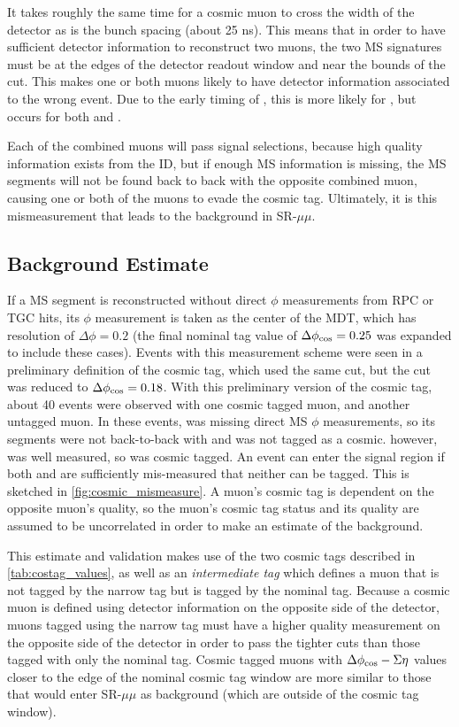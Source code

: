 It takes roughly the same time for a cosmic muon to cross the width of the detector as is the bunch spacing (about 25 ns). This means that in order to have sufficient detector information to reconstruct two muons, the two \ac{MS} signatures must be at the edges of the detector readout window and near the bounds of the \tavg cut. This makes one or both muons likely to have detector information associated to the wrong event. Due to the early timing of \mt, this is more likely for \mt, but occurs for both \mt and \mb. 

Each of the combined muons will pass signal selections, because high quality information exists from the \ac{ID}, but if enough \ac{MS} information is missing, the \ac{MS} segments will not be found back to back with the opposite combined muon, causing one or both of the muons to evade the cosmic tag. Ultimately, it is this mismeasurement that leads to the background in SR-$\mu\mu$. 


\subsection{Background Estimate}

If a \ac{MS} segment is reconstructed without direct $\phi$ measurements from \ac{RPC} or \ac{TGC} hits, its $\phi$ measurement is taken as the center of the \ac{MDT}, which has resolution of $\Delta \phi = 0.2$ (the final nominal tag value of $\Delta \phi_{\text{cos}} = 0.25$ was expanded to include these cases). Events with this measurement scheme were seen in a preliminary definition of the cosmic tag, which used the same \sigeta cut, but the \dphicos cut was reduced to $\Delta \phi_{\text{cos}} = 0.18$. With this preliminary version of the cosmic tag, about 40 events were observed with one cosmic tagged muon, and another untagged muon. In these events, \mt was missing direct \ac{MS} $\phi$ measurements, so its segments were not back-to-back with \mb and \mb was not tagged as a cosmic. \mb however, was well measured, so \mt was cosmic tagged. An event can enter the signal region if both \mb and \mt are sufficiently mis-measured that neither can be tagged. This is sketched in \autoref{fig:cosmic_mismeasure}. A muon's cosmic tag is dependent on the opposite muon's quality, so the muon's cosmic tag status and its quality are assumed to be uncorrelated in order to make an estimate of the background.

This estimate and validation makes use of the two cosmic tags described in \autoref{tab:costag_values}, as well as an \emph{intermediate tag} which defines a muon that is not tagged by the narrow tag but is tagged by the nominal tag. Because a cosmic muon is defined using detector information on the opposite side of the detector, muons tagged using the narrow tag must have a higher quality measurement on the opposite side of the detector in order to pass the tighter cuts than those tagged with only the nominal tag. Cosmic tagged muons with $\Delta \phi_{\text{cos}}-\Sigma \eta$ values closer to the edge of the nominal cosmic tag window are more similar to those that would enter SR-$\mu\mu$ as background (which are outside of the cosmic tag window). 




